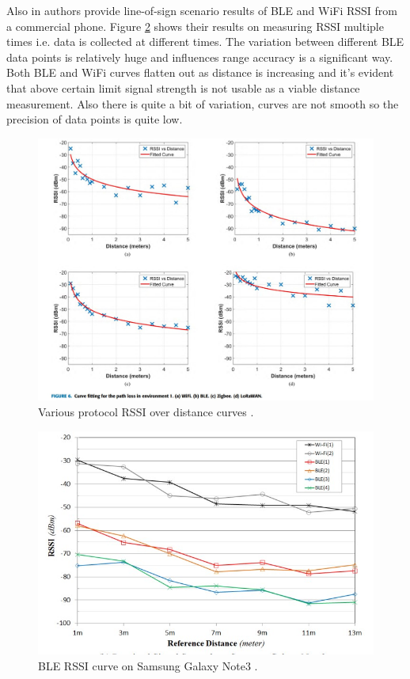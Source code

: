 Also in \cite{blerssi} authors provide line-of-sign scenario results of BLE and WiFi RSSI from a commercial phone. Figure \ref{fig:sec-rssi-curves} shows their results on measuring RSSI multiple times i.e. data is collected at different times. The variation between different BLE data points is relatively huge and influences range accuracy is a significant way. Both BLE and WiFi curves flatten out as distance is increasing and it's evident that above certain limit signal strength is not usable as a viable distance measurement. Also there is quite a bit of variation, curves are not smooth so the precision of data points is quite low.
\begin{figure}[H]
    \centering
    \includegraphics[width=.8\linewidth]{figures/RSSICurves.jpg}
    \caption{Various protocol RSSI over distance curves \cite{rssi-curves}.}
    \label{fig:rssi-curves}
\end{figure}
\begin{figure}[H]
    \centering
    \includegraphics[width=.7\linewidth]{figures/blesrri.jpg}
    \caption{BLE RSSI curve on  Samsung Galaxy Note3 \cite{blerssi}.}
    \label{fig:sec-rssi-curves}
\end{figure}

